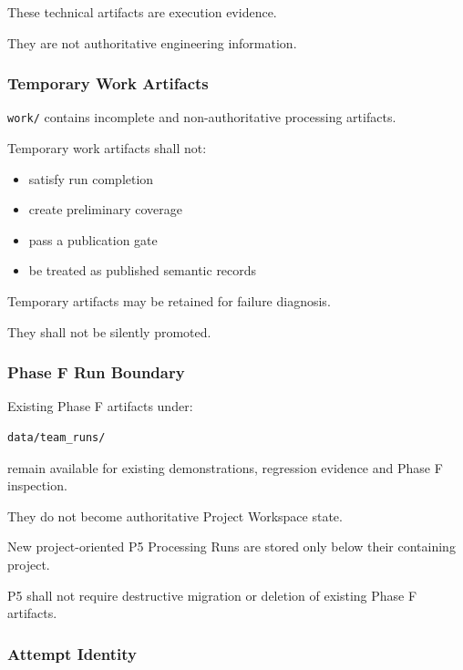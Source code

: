 These technical artifacts are execution evidence.

They are not authoritative engineering information.

\hypertarget{temporary-work-artifacts}{%
\subsubsection{Temporary Work Artifacts}\label{temporary-work-artifacts}}

\texttt{work/} contains incomplete and non-authoritative processing artifacts.

Temporary work artifacts shall not:

\begin{itemize}
\tightlist
\item
  satisfy run completion
\item
  create preliminary coverage
\item
  pass a publication gate
\item
  be treated as published semantic records
\end{itemize}

Temporary artifacts may be retained for failure diagnosis.

They shall not be silently promoted.

\hypertarget{phase-f-run-boundary}{%
\subsubsection{Phase F Run Boundary}\label{phase-f-run-boundary}}

Existing Phase F artifacts under:

\begin{verbatim}
data/team_runs/
\end{verbatim}

remain available for existing demonstrations, regression evidence and Phase F inspection.

They do not become authoritative Project Workspace state.

New project-oriented P5 Processing Runs are stored only below their containing project.

P5 shall not require destructive migration or deletion of existing Phase F artifacts.

\hypertarget{attempt-identity}{%
\subsubsection{Attempt Identity}\label{attempt-identity}}

